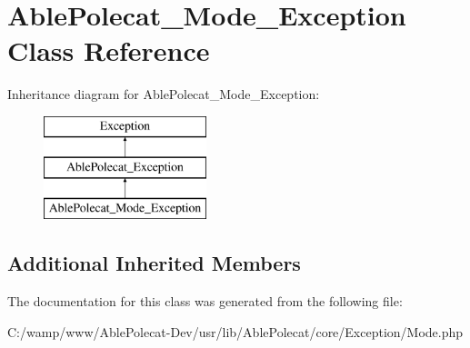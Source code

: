 \hypertarget{class_able_polecat___mode___exception}{}\section{Able\+Polecat\+\_\+\+Mode\+\_\+\+Exception Class Reference}
\label{class_able_polecat___mode___exception}
Inheritance diagram for Able\+Polecat\+\_\+\+Mode\+\_\+\+Exception\+:\begin{figure}[H]
\begin{center}
\leavevmode
\includegraphics[height=3.000000cm]{class_able_polecat___mode___exception}
\end{center}
\end{figure}
\subsection*{Additional Inherited Members}


The documentation for this class was generated from the following file\+:\begin{DoxyCompactItemize}
\item 
C\+:/wamp/www/\+Able\+Polecat-\/\+Dev/usr/lib/\+Able\+Polecat/core/\+Exception/Mode.\+php\end{DoxyCompactItemize}
